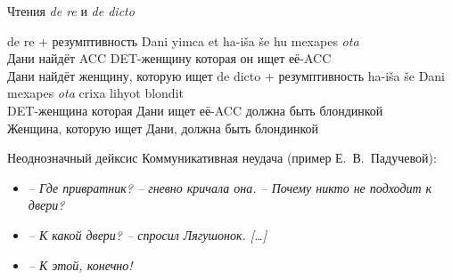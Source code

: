 \documentclass{beamer}
\begin{document}
\begin{frame}{Чтения \textit{de re} и \textit{de dicto}}
\smallskip
{\footnotesize	
\begin{exe}
\ex de re + резумптивность
\gll Dani yimca et ha-i\v{s}a \v{s}e hu mexapes \textit{ota}\\
Дани найдёт ACC DET-женщину которая он ищет её-ACC\\
\glt Дани найдёт женщину, которую ищет
\ex de dicto + резумптивность
\gll ha-i\v{s}a \v{s}e Dani mexapes \textit{ota} crixa lihyot blondit\\
DET-женщина которая Дани ищет её-ACC должна быть блондинкой\\
\glt Женщина, которую ищет Дани, должна быть блондинкой
\end{exe}		    
}
\end{frame}

\begin{frame}{Неоднозначный дейксис}
Коммуникативная неудача (пример Е.~В.~Падучевой):\\
\bigskip
\begin{itemize}
\item[] \textit{-- Где привратник? -- гневно кричала она. -- Почему никто не подходит к двери?}
\item[] \textit{-- К какой двери? -- спросил Лягушонок. [\dots]}
\item[] \textit{-- К этой, конечно!}
\end{itemize}
\end{frame}
\end{document}
